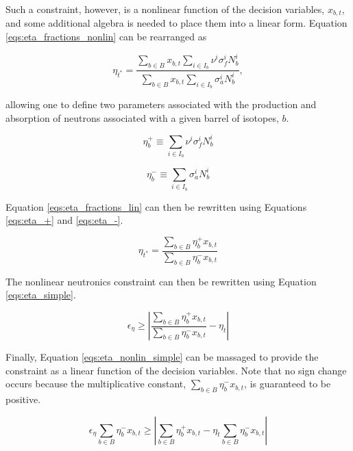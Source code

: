 Such a constraint, however, is a nonlinear function of the decision variables,
$x_{b,t}$, and some additional algebra is needed to place them into a linear
form. Equation \ref{eqs:eta_fractions_nonlin} can be rearranged as

\begin{equation}
\label{eqs:eta_fractions_lin}
\eta_{t^*} = \frac{\sum_{b \in B} x_{b, t} \sum_{i \in I_{b}} \nu^{i} \sigma_{f}^{i} N_{b}^{i}}
                {\sum_{b \in B} x_{b, t} \sum_{i \in I_{b}} \sigma_{a}^{i} N_{b}^{i}},
\end{equation}

allowing one to define two parameters associated with the production and
absorption of neutrons associated with a given barrel of isotopes, $b$.

\begin{equation}
\label{eqs:eta_+}
\eta_{b}^{+} \equiv \sum_{i \in I_{b}} \nu^{i} \sigma_{f}^{i} N_{b}^{i}
\end{equation}

\begin{equation}
\label{eqs:eta_-}
\eta_{b}^{-} \equiv \sum_{i \in I_{b}} \sigma_{a}^{i} N_{b}^{i}
\end{equation}

Equation \ref{eqs:eta_fractions_lin} can then be rewritten using Equations
\ref{eqs:eta_+} and \ref{eqs:eta_-}.

\begin{equation}
\label{eqs:eta_simple}
\eta_{t^*} = \frac{\sum_{b \in B} \eta_{b}^{+} x_{b, t}}
                {\sum_{b \in B} \eta_{b}^{-} x_{b, t}}
\end{equation}

The nonlinear neutronics constraint can then be rewritten using Equation
\ref{eqs:eta_simple}.

\begin{equation}
\label{eqs:eta_nonlin_simple}
\epsilon_{\eta} \geq \left| 
\frac{\sum_{b \in B} \eta_{b}^{+} x_{b,t}}
     {\sum_{b \in B} \eta_{b}^{-} x_{b,t}}
- \eta_{t} \right|
\end{equation}

Finally, Equation \ref{eqs:eta_nonlin_simple} can be massaged to provide the
constraint as a linear function of the decision variables. Note that no sign
change occurs because the multiplicative constant, $\sum_{b \in B} \eta_{b}^{-}
x_{b,t}$, is guaranteed to be positive.

\begin{equation}
\label{eqs:eta_linear}
\epsilon_{\eta} \sum_{b \in B} \eta_{b}^{-} x_{b,t} \geq
\left| \sum_{b \in B} \eta_{b}^{+} x_{b,t}
- \eta_{t} \sum_{b \in B} \eta_{b}^{-} x_{b,t} \right|
\end{equation}

